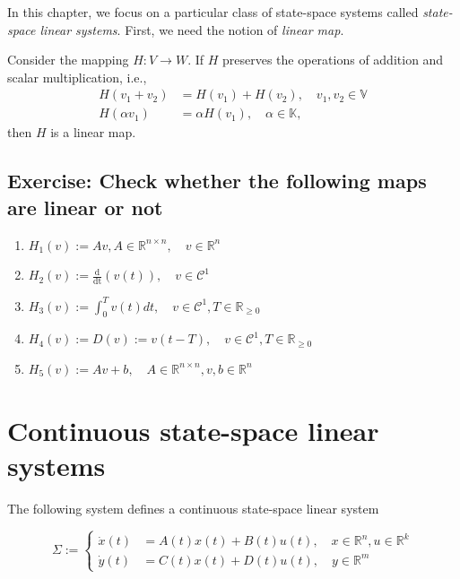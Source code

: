 In this chapter, we focus on a particular class of state-space systems called \emph{state-space linear systems}. First, we need the notion of \emph{linear map}.

\begin{definition} Consider the mapping $H: V \to W$. If $H$ preserves the operations of addition and scalar multiplication, i.e.,
\begin{align}
	H(v_1+v_2) &= H(v_1) + H(v_2), \quad v_1, v_2\in\mathbb{V} \nonumber \\
	H(\alpha v_1) &= \alpha H(v_1), \quad \alpha\in\mathbb{K} \nonumber,
\end{align}
then $H$ is a linear map.
\end{definition}

\subsection{Exercise: Check whether the following maps are linear or not}

\begin{enumerate}
	\item $H_1(v) := Av, A\in\mathbb{R}^{n\times n}, \quad v\in\mathbb{R}^n$
	\item $H_2(v) := \frac{\mathrm{d}}{\mathrm{dt}}(v(t)), \quad v\in\mathcal{C}^1$
	\item $H_3(v) := \int_0^T v(t) dt, \quad v\in\mathcal{C}^1, T\in\mathbb{R}_{\geq 0}$
	\item $H_4(v) := D(v) := v(t - T), \quad v\in\mathcal{C}^1, T\in\mathbb{R}_{\geq 0}$
	\item $H_5(v) := Av + b, \quad A\in\mathbb{R}^{n\times n}, v,b\in\mathbb{R}^n$
\end{enumerate}

\section{Continuous state-space linear systems}

The following system defines a continuous state-space linear system

\begin{equation}
	\Sigma := \begin{cases}
	\dot x(t) &= A(t)x(t) + B(t)u(t), \quad x\in\mathbb{R}^n, u\in\mathbb{R}^k \\
	\dot y(t) &= C(t)x(t) + D(t)u(t), \quad y\in\mathbb{R}^m
	\end{cases}
	\label{eq: linsys}
\end{equation}

